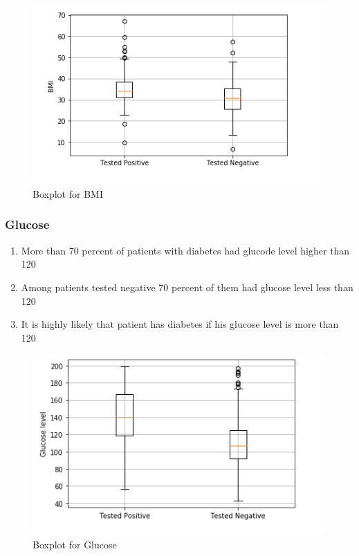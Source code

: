 \documentclass[12pt]{article}
\begin{document}
\begin{figure}[h]
\centering
\includegraphics[scale=0.65]{boxplot_BMI.PNG} 
\caption{Boxplot for BMI}
\label{etiqueta}
\end{figure}

\subsubsection{Glucose}

\begin{enumerate}
\item More than 70 percent of patients with diabetes had glucode level higher than 120
\item Among patients tested negative 70 percent of them had glucose level less than 120
\item It is highly likely that patient has diabetes if his glucose level is more than 120
\end{enumerate}

\begin{figure}[h]
\centering
\includegraphics[scale=0.65]{boxplot_glucose.PNG} 
\caption{Boxplot for Glucose}
\label{etiqueta}
\end{figure}
\end{document}
